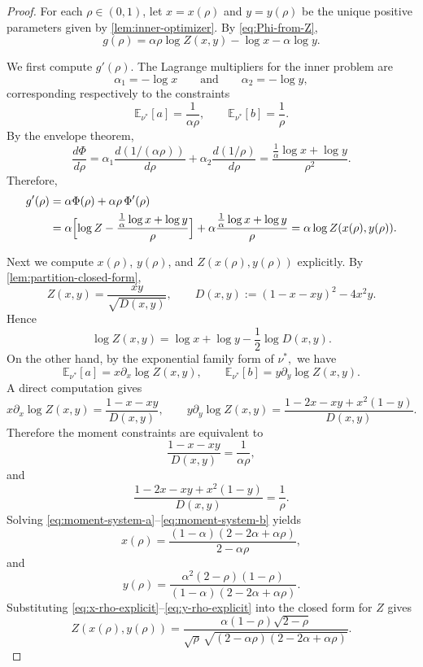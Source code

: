 \documentclass[10pt,a4paper]{amsart}
\newcommand{\E}{\mathbb{E}}
\begin{document}
\begin{proof}
For each \(\rho\in(0,1)\), let \(x=x(\rho)\) and \(y=y(\rho)\) be the unique
positive parameters given by \cref{lem:inner-optimizer}. By \eqref{eq:Phi-from-Z},
\begin{equation}\label{eq:g-rho-from-Z}
    g(\rho)=\alpha\rho\log Z(x,y)-\log x-\alpha\log y.
\end{equation}

We first compute \(g'(\rho)\). The Lagrange multipliers for the inner problem are
\[
\alpha_1=-\log x
\qquad\text{and}\qquad
\alpha_2=-\log y,
\]
corresponding respectively to the constraints
\[
\E_{\nu^*}[a]=\frac{1}{\alpha\rho},
\qquad
\E_{\nu^*}[b]=\frac{1}{\rho}.
\]
By the envelope theorem,
\[
\frac{d\Phi}{d\rho}
=
\alpha_1\frac{d(1/(\alpha\rho))}{d\rho}
+
\alpha_2\frac{d(1/\rho)}{d\rho}
=
\frac{\frac1\alpha\log x+\log y}{\rho^2}.
\]
Therefore,
\begin{align}
g'(\rho)
&=
\alpha\Phi(\rho)+\alpha\rho\,\Phi'(\rho) \notag\\
&=
\alpha\Bigl[\log Z-\frac{\frac1\alpha\log x+\log y}{\rho}\Bigr]
+
\alpha\frac{\frac1\alpha\log x+\log y}{\rho}
=
\alpha\log Z(x(\rho),y(\rho)).
\label{eq:g-prime-alpha-logZ}
\end{align}

Next we compute \(x(\rho)\), \(y(\rho)\), and \(Z(x(\rho),y(\rho))\) explicitly.
By \cref{lem:partition-closed-form},
\[
Z(x,y)=\frac{xy}{\sqrt{D(x,y)}},
\qquad
D(x,y):=(1-x-xy)^2-4x^2y.
\]
Hence
\[
\log Z(x,y)=\log x+\log y-\frac12\log D(x,y).
\]
On the other hand, by the exponential family form of $\nu^*,$ we have
\[
\E_{\nu^*}[a]=x\partial_x\log Z(x,y),
\qquad
\E_{\nu^*}[b]=y\partial_y\log Z(x,y).
\]
A direct computation gives
\[
x\partial_x\log Z(x,y)=\frac{1-x-xy}{D(x,y)},
\qquad
y\partial_y\log Z(x,y)=\frac{1-2x-xy+x^2(1-y)}{D(x,y)}.
\]
Therefore the moment constraints are equivalent to
\begin{equation}\label{eq:moment-system-a}
    \frac{1-x-xy}{D(x,y)}=\frac{1}{\alpha\rho},
\end{equation}
and
\begin{equation}\label{eq:moment-system-b}
    \frac{1-2x-xy+x^2(1-y)}{D(x,y)}=\frac{1}{\rho}.
\end{equation}
Solving \eqref{eq:moment-system-a}--\eqref{eq:moment-system-b} yields
\begin{equation}\label{eq:x-rho-explicit}
    x(\rho)=\frac{(1-\alpha)(2-2\alpha+\alpha\rho)}{2-\alpha\rho},
\end{equation}
and
\begin{equation}\label{eq:y-rho-explicit}
    y(\rho)=\frac{\alpha^2(2-\rho)(1-\rho)}{(1-\alpha)(2-2\alpha+\alpha\rho)}.
\end{equation}
Substituting \eqref{eq:x-rho-explicit}--\eqref{eq:y-rho-explicit} into the
closed form for \(Z\) gives
\begin{equation}\label{eq:Z-rho-explicit}
    Z(x(\rho),y(\rho))
    =
    \frac{\alpha(1-\rho)\sqrt{2-\rho}}
    {\sqrt{\rho}\,\sqrt{(2-\alpha\rho)(2-2\alpha+\alpha\rho)}}.
\end{equation}


\end{proof}
\end{document}

